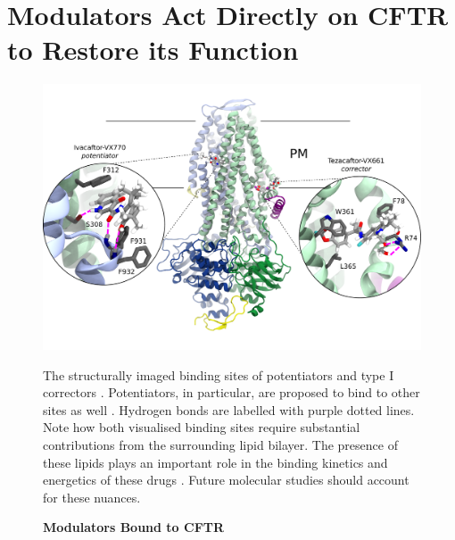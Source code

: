 
\section{Modulators Act Directly on CFTR to Restore its Function}
\begin{figure}
	\begin{center}
		\includegraphics[width=1\textwidth]{figures/drugs_bound_overall.pdf}
	\end{center}
	\captionsetup{singlelinecheck = false, justification=raggedright}
	\caption[Modulators Bound to CFTR] {\textbf{Modulators Bound to CFTR}}{The structurally imaged binding sites of potentiators and type I correctors \cite{liu2019, fiedorczuk2022}. Potentiators, in particular, are proposed to bind to other sites as well \cite{yeh2019, liu2019}. Hydrogen bonds are labelled with purple dotted lines. Note how both visualised binding sites require substantial contributions from the surrounding lipid bilayer. The presence of these lipids plays an important role in the binding kinetics and energetics of these drugs \cite{csanady2019}. Future molecular studies should account for these nuances.} 
\end{figure}

